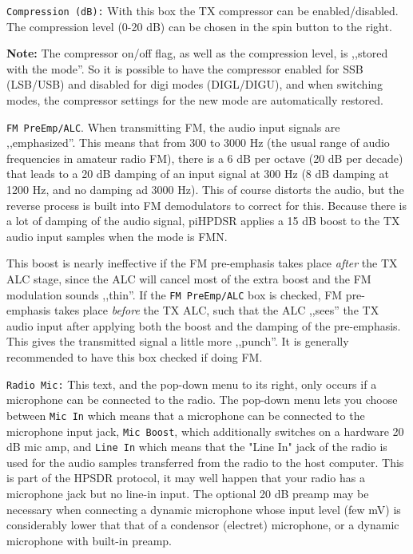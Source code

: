 \documentclass[12pt]{book}
\def\rett#1{\texttt{\color{red}#1}}
\begin{document}
\rett{Compression (dB):} With this box the TX compressor can be enabled/disabled.
The compression level (0-20 dB) can be chosen in the spin button to the right.

\textbf{Note:} The compressor on/off flag, as well as the compression level, is
,,stored with the mode''. So it is possible to have the compressor enabled for SSB
(LSB/USB) 
and disabled for digi modes (DIGL/DIGU), and when switching modes, the compressor
settings for the new mode are automatically restored.

\rett{FM PreEmp/ALC}. When transmitting FM, the audio input signals are ,,emphasized''.
This means that from 300 to 3000 Hz (the usual range of audio frequencies in amateur
radio FM), there is a 6 dB per octave (20 dB per decade) that leads to a 20 dB damping
of an input signal at 300 Hz (8 dB damping at 1200 Hz, and no damping ad 3000 Hz).
This of course distorts the audio, but the reverse process is built into FM demodulators
to correct for this. Because there is a lot of damping of the audio signal, piHPDSR
applies a 15 dB boost to the TX audio input samples when the mode is FMN.

This boost is nearly ineffective if the FM pre-emphasis takes place \textit{after}
the TX ALC stage, since the ALC will cancel most of the extra boost and the FM
modulation sounds ,,thin''. If the \rett{FM PreEmp/ALC} box is checked, FM
pre-emphasis takes place \textit{before} the TX ALC, such that the ALC ,,sees''
the TX audio input after applying both the boost and the damping of the pre-emphasis. This gives the
transmitted signal a little more ,,punch''. It is generally recommended to have this box checked
if doing FM.

\rett{Radio Mic:} This text, and the pop-down menu to its right, only occurs if a microphone can
be connected to the radio. The pop-down menu lets you choose between \rett{Mic In} which means
that a microphone can be connected to the microphone input jack, \rett{Mic Boost}, which
additionally switches on a hardware 20 dB mic amp, and \rett{Line In} which means that the
"Line In" jack of the radio is used for the audio samples transferred from the radio to the
host computer. This is part of the HPSDR protocol, it may well happen that your radio has a
microphone jack but no line-in input. The optional 20 dB preamp may be necessary when connecting
a dynamic microphone whose input level (few mV) is considerably lower that that of a 
condensor (electret) microphone, or a dynamic microphone with built-in preamp.
\end{document}
